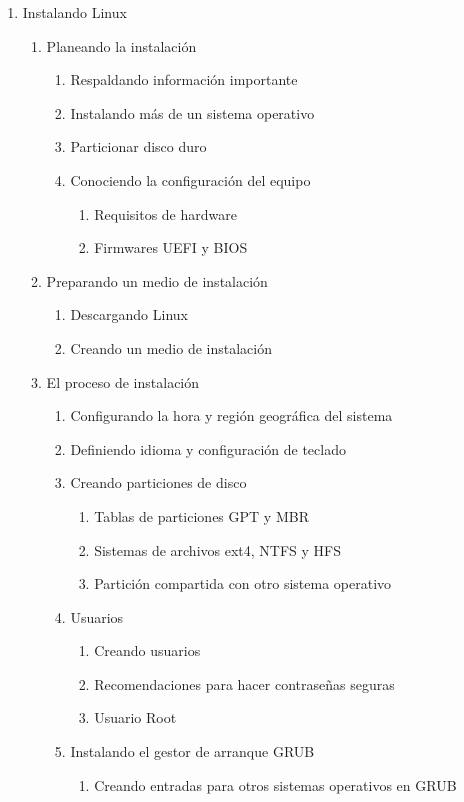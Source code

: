 \documentclass[12pt, letter-paper]{article}
\begin{document}
\begin{enumerate}
\item Instalando Linux
  \begin{enumerate}
  \item Planeando la instalación
    \begin{enumerate}
    \item Respaldando información importante
    \item Instalando más de un sistema operativo
    \item Particionar disco duro
    \item Conociendo la configuración del equipo
      \begin{enumerate}
      \item Requisitos de hardware
      \item Firmwares UEFI y BIOS
      \end{enumerate}
    \end{enumerate}
  \item Preparando un medio de instalación
    \begin{enumerate}
    \item Descargando Linux
    \item Creando un medio de instalación
    \end{enumerate}
  \item El proceso de instalación
    \begin{enumerate}
    \item Configurando la hora y región geográfica del sistema
    \item Definiendo idioma y configuración de teclado
    \item Creando particiones de disco
      \begin{enumerate}
      \item Tablas de particiones GPT y MBR
      \item Sistemas de archivos ext4, NTFS y HFS
      \item Partición compartida con otro sistema operativo
      \end{enumerate}
    \item Usuarios
      \begin{enumerate}
      \item Creando usuarios
      \item Recomendaciones para hacer contraseñas seguras
      \item Usuario Root
      \end{enumerate}
    \item Instalando el gestor de arranque GRUB
      \begin{enumerate}
      \item Creando entradas para otros sistemas operativos en GRUB
      \end{enumerate}
    \end{enumerate}
  \end{enumerate}
  

\end{enumerate}
\end{document}
